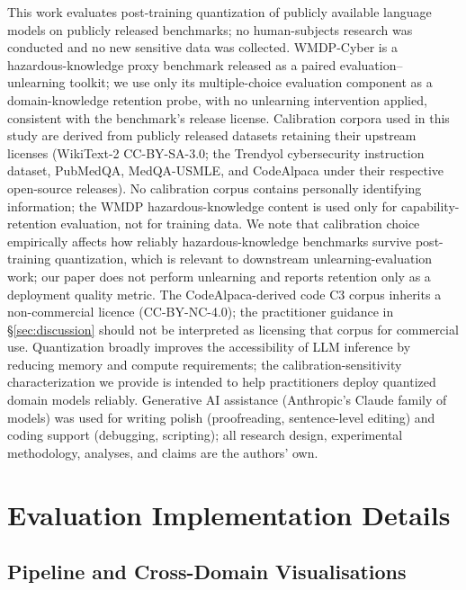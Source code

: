 \documentclass[11pt]{article}
\newcommand{\wmdp}{WMDP-Cyber}
\begin{document}
\begin{sloppypar}
This work evaluates post-training quantization of publicly available
language models on publicly released benchmarks; no human-subjects
research was conducted and no new sensitive data was collected.
\wmdp{} \citep{li2024wmdp} is a hazardous-knowledge proxy
benchmark released as a paired evaluation--unlearning toolkit; we
use only its multiple-choice evaluation component as a
domain-knowledge retention probe, with no unlearning intervention
applied, consistent with the benchmark's release license.
Calibration corpora used in this study are derived from publicly
released datasets retaining their upstream licenses (WikiText-2
CC-BY-SA-3.0; the Trendyol cybersecurity instruction dataset,
PubMedQA, MedQA-USMLE, and CodeAlpaca under their respective
open-source releases).  No calibration corpus contains personally
identifying information; the WMDP hazardous-knowledge content is
used only for capability-retention evaluation, not for training
data.  We note that calibration choice empirically affects how
reliably hazardous-knowledge benchmarks survive post-training
quantization, which is relevant to downstream unlearning-evaluation
work; our paper does not perform unlearning and reports retention
only as a deployment quality metric.  The CodeAlpaca-derived code
C3 corpus inherits a non-commercial licence (CC-BY-NC-4.0); the
practitioner guidance in \S\ref{sec:discussion} should not be
interpreted as licensing that corpus for commercial use.  Quantization broadly improves the accessibility of LLM
inference by reducing memory and compute requirements; the
calibration-sensitivity characterization we provide is intended to
help practitioners deploy quantized domain models reliably.
Generative AI assistance (Anthropic's Claude family of models) was
used for writing polish (proofreading, sentence-level editing) and
coding support (debugging, scripting); all research design,
experimental methodology, analyses, and claims are the authors' own.
\end{sloppypar}

\appendix

\section{Evaluation Implementation Details}
\label{app:eval}

\subsection{Pipeline and Cross-Domain Visualisations}
\label{app:pipeline}
\end{document}
